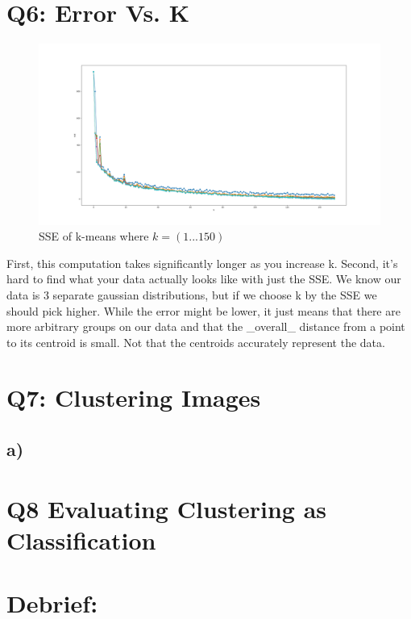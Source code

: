 \documentclass{article}
\begin{document}
    \section*{Q6: Error Vs. K}
        \begin{figure}[!h]
            \centering
            \includegraphics[width=\textwidth]{"Q6_Error_vs_k.png"}
            \caption{SSE of k-means where $k = (1 ... 150)$}
        \end{figure}   
        \qquad First, this computation takes significantly longer as you increase k. 
        Second, it's hard to find what your data actually looks like with just the SSE. We know our data is 3 separate gaussian distributions, but if we choose k by the SSE we should pick higher.
        While the error might be lower, it just means that there are more arbitrary groups on our data and that the _overall_ distance from a point to its centroid is small. Not that the centroids accurately represent the data.
    

    \section*{Q7: Clustering Images}
        \subsection*{a)}


    \section*{Q8 Evaluating Clustering as Classification}
    \section*{Debrief:}
\end{document}
